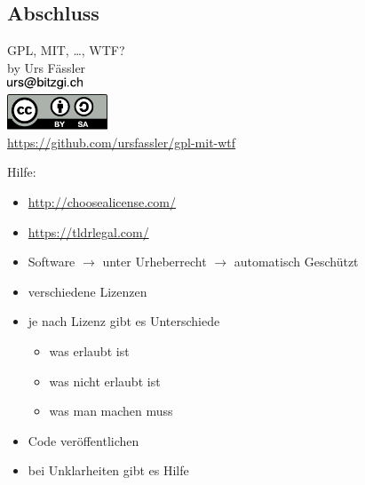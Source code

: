 
\subsection{Abschluss}
\label{sec:zusammenfassung}
\subsectionframe

\begin{frame}
	\begin{center}
		{\large GPL, MIT, \ldots, WTF?}\\
		\vspace{0.5em}
		by Urs Fässler\\
		\includegraphics[width=2.25cm]{res/mail.pdf}\\
		\pause
		\vspace{0.5em}
		\includegraphics[width=3cm]{res/cc-by-sa.pdf}\\
		\pause
		\vspace{1em}
		\url{https://github.com/ursfassler/gpl-mit-wtf}\\
	\end{center}

	\pause
	Hilfe:
	\begin{itemize}
		\pause
		\item \url{http://choosealicense.com/}
		\pause
		\item \url{https://tldrlegal.com/}
	\end{itemize}
\end{frame}
\note
{
	\begin{itemize}
		\item Software $\rightarrow$ unter Urheberrecht $\rightarrow$ automatisch Geschützt
		\item verschiedene Lizenzen
		\item je nach Lizenz gibt es Unterschiede
		\begin{itemize}
			\item was erlaubt ist
			\item was nicht erlaubt ist
			\item was man machen muss
		\end{itemize}
		\item Code veröffentlichen
		\item bei Unklarheiten gibt es Hilfe
	\end{itemize}
}

